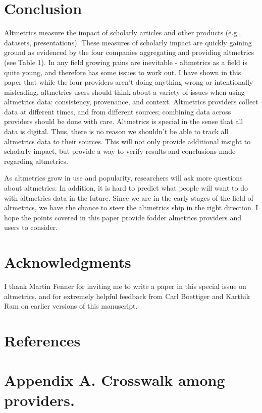 \documentclass[letterpaper,superscriptaddress,showkeys,longbibliography]{revtex4-1}\usepackage{graphicx, color}
\begin{document}
\section*{Conclusion}

Altmetrics measure the impact of scholarly articles and other products (e.g., datasets, presentations). These measures of scholarly impact are quickly gaining ground as evidenced by the four companies aggregating and providing altmetrics (see Table 1). In any field growing pains are inevitable - altmetrics as a field is quite young, and therefore has some issues to work out. I have shown in this paper that while the four providers aren't doing anything wrong or intentionally misleading, altmetrics users should think about a variety of issues when using altmetrics data: consistency, provenance, and context. Altmetrics providers collect data at different times, and from different sources; combining data across providers should be done with care. Altmetrics is special in the sense that all data is digital. Thus, there is no reason we shouldn't be able to track all altmetrics data to their sources. This will not only provide additional insight to scholarly impact, but provide a way to verify results and conclusions made regarding altmetrics. 

As altmetrics grow in use and popularity, researchers will ask more questions about altmetrics. In addition, it is hard to predict what people will want to do with altmetrics data in the future. Since we are in the early stages of the field of altmetrics, we have the chance to steer the altmetrics ship in the right direction. I hope the points covered in this paper provide fodder almetrics providers and users to consider.

\section*{Acknowledgments}

I thank Martin Fenner for inviting me to write a paper in this special issue on altmetrics, and for extremely helpful feedback from Carl Boettiger and Karthik Ram on earlier versions of this manuscript.
  
\section*{References}


\newpage

\section*{Appendix A. Crosswalk among providers.}
\end{document}
